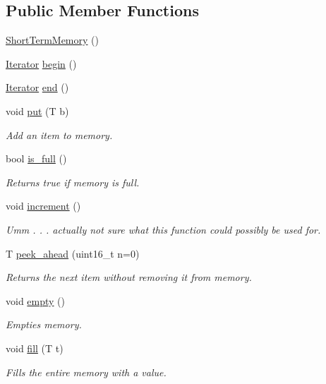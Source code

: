 \subsection*{Public Member Functions}
\begin{DoxyCompactItemize}
\item 
\hyperlink{classetk_1_1_short_term_memory_ae67c5592845e9b5a3b1478785f5d4733}{Short\-Term\-Memory} ()
\item 
\hyperlink{classetk_1_1_short_term_memory_1_1_iterator}{Iterator} \hyperlink{classetk_1_1_short_term_memory_a2a2d18853489aaa9f4462b73109a5441}{begin} ()
\item 
\hyperlink{classetk_1_1_short_term_memory_1_1_iterator}{Iterator} \hyperlink{classetk_1_1_short_term_memory_acf6db78d7b713ea53bc12ede90018ee5}{end} ()
\item 
void \hyperlink{classetk_1_1_short_term_memory_a960b35e4870eba7f21446816b0762357}{put} (T b)
\begin{DoxyCompactList}\small\item\em Add an item to memory. \end{DoxyCompactList}\item 
bool \hyperlink{classetk_1_1_short_term_memory_a1f4bb161b90b3afefb5ed3906cafceb0}{is\-\_\-full} ()
\begin{DoxyCompactList}\small\item\em Returns true if memory is full. \end{DoxyCompactList}\item 
void \hyperlink{classetk_1_1_short_term_memory_adb7d21b91f38eaee4da9be13b4eaf5f9}{increment} ()
\begin{DoxyCompactList}\small\item\em Umm . . . actually not sure what this function could possibly be used for. \end{DoxyCompactList}\item 
T \hyperlink{classetk_1_1_short_term_memory_a127b78910d95882aeb29df31d1ae7243}{peek\-\_\-ahead} (uint16\-\_\-t n=0)
\begin{DoxyCompactList}\small\item\em Returns the next item without removing it from memory. \end{DoxyCompactList}\item 
void \hyperlink{classetk_1_1_short_term_memory_a7a8b7aa0f74d5163b304b03f27dc7fed}{empty} ()
\begin{DoxyCompactList}\small\item\em Empties memory. \end{DoxyCompactList}\item 
void \hyperlink{classetk_1_1_short_term_memory_a69bbdd78237057d731fea8895d2df7e8}{fill} (T t)
\begin{DoxyCompactList}\small\item\em Fills the entire memory with a value. \end{DoxyCompactList}\end{DoxyCompactItemize}


